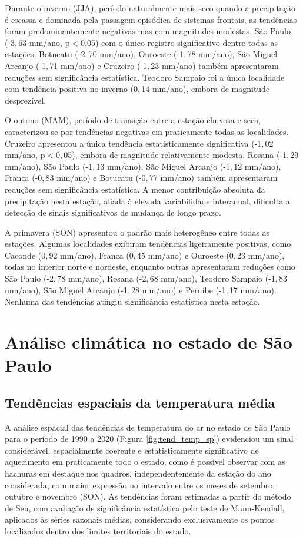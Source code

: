 Durante o inverno (JJA), período naturalmente mais seco quando a precipitação é escassa e dominada pela passagem episódica de sistemas frontais, as tendências foram predominantemente negativas mas com magnitudes modestas. São Paulo (-3${,}$63 mm/ano, p$<$0,05) com o único registro significativo dentre todas as estações, Botucatu (-2${,}$70 mm/ano), Ouroeste (-1${,}$78 mm/ano), São Miguel Arcanjo (-1${,}$71 mm/ano) e Cruzeiro (-1${,}$23 mm/ano) também apresentaram reduções sem significância estatística. Teodoro Sampaio foi a única localidade com tendência positiva no inverno (0${,}$14 mm/ano), embora de magnitude desprezível.

O outono (MAM), período de transição entre a estação chuvosa e seca, caracterizou-se por tendências negativas em praticamente todas as localidades. Cruzeiro apresentou a única tendência estatisticamente significativa (-1${,}$02 mm/ano, p$<$0${,}$05), embora de magnitude relativamente modesta. Rosana (-1${,}$29 mm/ano), São Paulo (-1${,}$13 mm/ano), São Miguel Arcanjo (-1${,}$12 mm/ano), Franca (-0${,}$83 mm/ano) e Botucatu (-0${,}$77 mm/ano) também apresentaram reduções sem significância estatística. A menor contribuição absoluta da precipitação nesta estação, aliada à elevada variabilidade interanual, dificulta a detecção de sinais significativos de mudança de longo prazo.

A primavera (SON) apresentou o padrão mais heterogêneo entre todas as estações. Algumas localidades exibiram tendências ligeiramente positivas, como Caconde (0${,}$92 mm/ano), Franca (0${,}$45 mm/ano) e Ouroeste (0${,}$23 mm/ano), todas no interior norte e nordeste, enquanto outras apresentaram reduções como São Paulo (-2${,}$78 mm/ano), Rosana (-2${,}$68 mm/ano), Teodoro Sampaio (-1${,}$83 mm/ano), São Miguel Arcanjo (-1${,}$28 mm/ano) e Peruíbe (-1${,}$17 mm/ano). Nenhuma das tendências atingiu significância estatística nesta estação.

\section{Análise climática no estado de São Paulo}

\subsection{Tendências espaciais da temperatura média}

A análise espacial das tendências de temperatura do ar no estado de São Paulo para o período de 1990 a 2020 (Figura \ref{fig:tend_temp_sp}) evidenciou um sinal considerável, espacialmente coerente e estatisticamente significativo de aquecimento em praticamente todo o estado, como é possível observar com as hachuras em destaque nos quadros, independentemente da estação do ano considerada, com maior expressão no intervalo entre os meses de setembro, outubro e novembro (SON). As tendências foram estimadas a partir do método de Sen, com avaliação de significância estatística pelo teste de Mann-Kendall, aplicados às séries sazonais médias, considerando exclusivamente os pontos localizados dentro dos limites territoriais do estado.

